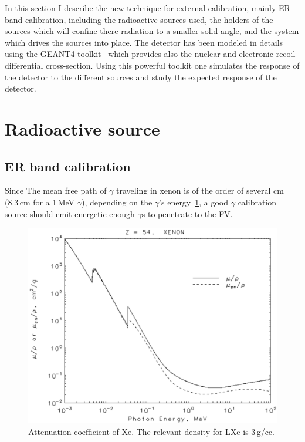 In this section I describe the new technique for external calibration, mainly ER band calibration, including the radioactive sources used, the holders of the sources which will confine there radiation to a smaller solid angle, and the system which drives the sources into place. The detector has been modeled in details using the GEANT4 toolkit~\cite{AGOSTINELLI2003250} which provides also the nuclear and electronic recoil differential cross-section. Using this powerful toolkit one simulates the response of the detector to the different sources and study the expected response of the detector. 



\section{Radioactive source}
\label{sec:source}
\subsection{ER band calibration}
Since The mean free path of $\gamma$ traveling in xenon is of the order of several cm (8.3\,cm for a 1\,MeV $\gamma$), depending on the $\gamma$'s energy~\ref{fig:MFP}, a good $\gamma$ calibration source should emit energetic enough $\gamma$s to penetrate to the FV. 

\begin{figure}
	\begin{center}
	\includegraphics[width=\textwidth]{figs/NISTAttXenon.png}%
		\caption{\label{fig:MFP} Attenuation coefficient of Xe. The relevant density for LXe is 3\,g/cc.}
		\end{center}
	
\end{figure} 

